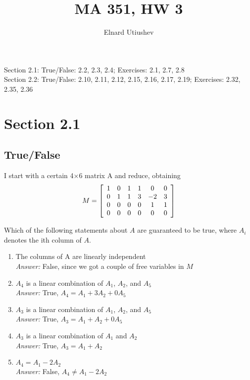 \documentclass[letterpaper]{article}
\title{MA 351, HW 3}
\author{Elnard Utiushev}
\newcommand{\ans}{\textit{Answer: }}
\newenvironment{question}[2][Question]{\begin{trivlist}
\item[\hskip \labelsep {\bfseries #1}\hskip \labelsep {\bfseries #2.}]}{\end{trivlist}}
\begin{document}
\maketitle

Section 2.1: True/False: 2.2, 2.3, 2.4; Exercises: 2.1, 2.7, 2.8 \\
Section 2.2: True/False: 2.10, 2.11, 2.12, 2.15, 2.16, 2.17, 2.19; Exercises: 2.32, 2.35, 2.36

\section{Section 2.1}
\subsection{True/False}

\begin{question}{2.2}
    I start with a certain 4×6 matrix A and reduce, obtaining
    $$M = \left[ \begin{array} { c c c c c c } { 1 } & { 0 } & { 1 } & { 1 } & { 0 } & { 0 } \\ { 0 } & { 1 } & { 1 } & { 3 } & { - 2 } & { 3 } \\ { 0 } & { 0 } & { 0 } & { 0 } & { 1 } & { 1 } \\ { 0 } & { 0 } & { 0 } & { 0 } & { 0 } & { 0 } \end{array} \right]$$

    Which of the following statements about $A$ are guaranteed to be true, where $A_i$ denotes the ith column of $A$.

    \begin{enumerate}[label=\textbf{(\alph*)}]
        \item The columns of A are linearly independent \\ 
        \ans False, since we got a couple of free variables in $M$

        \item $A_4$ is a linear combination of $A_1$, $A_2$, and $A_5$ \\
        \ans True, $A_4 = A_1 + 3A_2 + 0A_5$

        \item $A_3$ is a linear combination of $A_1$, $A_2$, and $A_5$ \\
        \ans True, $A_3 = A_1 + A_2 + 0A_5$

        \item $A_3$ is a linear combination of $A_1$ and $A_2$ \\
        \ans True, $A_3 = A_1 + A_2$

        \item $A_4 = A_1 - 2A_2$ \\ 
        \ans False, $A_4 \neq A_1 - 2A_2$
    \end{enumerate}

\end{question}
\end{document}
